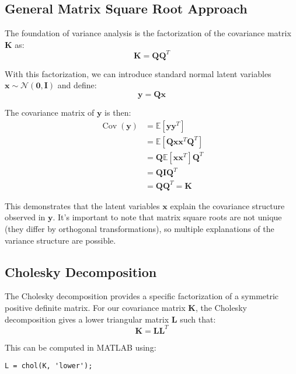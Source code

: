 \documentclass{article}
\begin{document}
\subsection{General Matrix Square Root Approach}

The foundation of variance analysis is the factorization of the covariance matrix $\mathbf{K}$ as:
\begin{equation}
\mathbf{K} = \mathbf{Q}\mathbf{Q}^T
\end{equation}

With this factorization, we can introduce standard normal latent variables $\mathbf{x} \sim \mathcal{N}(\mathbf{0}, \mathbf{I})$ and define:
\begin{equation}
\mathbf{y} = \mathbf{Q}\mathbf{x}
\end{equation}

The covariance matrix of $\mathbf{y}$ is then:
\begin{align}
\operatorname{Cov}(\mathbf{y}) &= \mathbb{E}[\mathbf{y}\mathbf{y}^T] \\
&= \mathbb{E}[\mathbf{Q}\mathbf{x}\mathbf{x}^T\mathbf{Q}^T] \\
&= \mathbf{Q}\mathbb{E}[\mathbf{x}\mathbf{x}^T]\mathbf{Q}^T \\
&= \mathbf{Q}\mathbf{I}\mathbf{Q}^T \\
&= \mathbf{Q}\mathbf{Q}^T = \mathbf{K}
\end{align}

This demonstrates that the latent variables $\mathbf{x}$ explain the covariance structure observed in $\mathbf{y}$. It's important to note that matrix square roots are not unique (they differ by orthogonal transformations), so multiple explanations of the variance structure are possible.

\subsection{Cholesky Decomposition}

The Cholesky decomposition provides a specific factorization of a symmetric positive definite matrix. For our covariance matrix $\mathbf{K}$, the Cholesky decomposition gives a lower triangular matrix $\mathbf{L}$ such that:
\begin{equation}
\mathbf{K} = \mathbf{L}\mathbf{L}^T
\end{equation}

This can be computed in MATLAB using:
\begin{verbatim}
L = chol(K, 'lower');
\end{verbatim}
\end{document}
